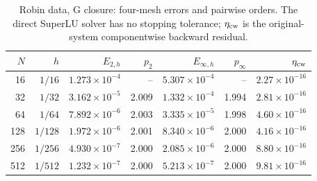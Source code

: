 \begin{table}[htbp]
\centering
\small
\setlength{\tabcolsep}{4pt}
\begin{tabular}{rrrrrrr}
\toprule
$N$ & $h$ & $E_{2,h}$ & $p_2$ & $E_{\infty,h}$ & $p_\infty$ & $\eta_{\rm cw}$ \\
\midrule
16 & $1/16$ & $1.273\times10^{-4}$ & -- & $5.307\times10^{-4}$ & -- & $2.27\times10^{-16}$ \\
32 & $1/32$ & $3.162\times10^{-5}$ & 2.009 & $1.332\times10^{-4}$ & 1.994 & $2.81\times10^{-16}$ \\
64 & $1/64$ & $7.892\times10^{-6}$ & 2.003 & $3.335\times10^{-5}$ & 1.998 & $4.60\times10^{-16}$ \\
128 & $1/128$ & $1.972\times10^{-6}$ & 2.001 & $8.340\times10^{-6}$ & 2.000 & $4.16\times10^{-16}$ \\
256 & $1/256$ & $4.930\times10^{-7}$ & 2.000 & $2.085\times10^{-6}$ & 2.000 & $8.80\times10^{-16}$ \\
512 & $1/512$ & $1.232\times10^{-7}$ & 2.000 & $5.213\times10^{-7}$ & 2.000 & $9.81\times10^{-16}$ \\
\bottomrule
\end{tabular}
\caption{Robin data, G closure: four-mesh errors and pairwise orders. The direct SuperLU solver has no stopping tolerance; $\eta_{\rm cw}$ is the original-system componentwise backward residual.}
\label{tab:refinement-robin-ghost}
\end{table}
